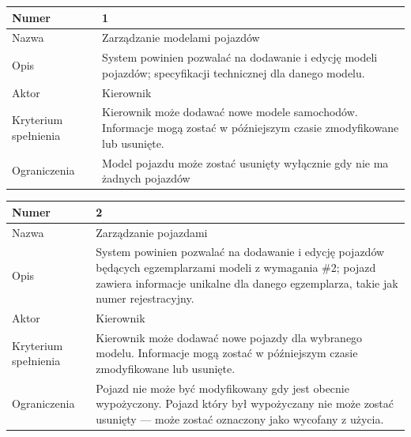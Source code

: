 \documentclass[eng,printmode,openany]{mgr}
\begin{document}
	\begin{table}[H]
		\begin{tabularx}{\textwidth}{|l|X|}
			\hline
			Numer                & 1  \\ \hline
			Nazwa                & Zarządzanie modelami pojazdów \\ \hline
			Opis                 & System powinien pozwalać na dodawanie i edycję modeli pojazdów; specyfikacji technicznej dla danego modelu.    \\ \hline
			Aktor                & Kierownik \\ \hline
			Kryterium spełnienia & Kierownik może dodawać nowe modele samochodów. Informacje mogą zostać w późniejszym czasie zmodyfikowane lub usunięte.\\ \hline
			Ograniczenia         & Model pojazdu może zostać usunięty wyłącznie gdy nie ma żadnych pojazdów \\ \hline
		\end{tabularx}
	\end{table}
	
	\begin{table}[H]
		\begin{tabularx}{\textwidth}{|l|X|}
			\hline
			Numer                & 2 \\ \hline
			Nazwa                & Zarządzanie pojazdami \\ \hline
			Opis                 & System powinien pozwalać na dodawanie i edycję pojazdów będących egzemplarzami modeli z wymagania \#2; pojazd zawiera informacje unikalne dla danego egzemplarza, takie jak numer rejestracyjny.     \\ \hline
			Aktor                & Kierownik \\ \hline
			Kryterium spełnienia & Kierownik może dodawać nowe pojazdy dla wybranego modelu. Informacje mogą zostać w późniejszym czasie zmodyfikowane lub usunięte.\\ \hline
			Ograniczenia         & Pojazd nie może być modyfikowany gdy jest obecnie wypożyczony. Pojazd który był wypożyczany nie może zostać usunięty — może zostać oznaczony jako wycofany z użycia. \\ \hline
		\end{tabularx}
	\end{table}
	
\end{document}
